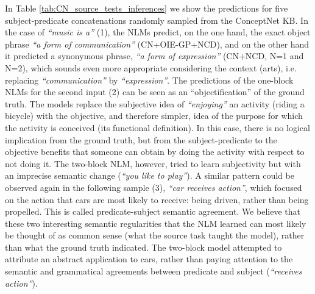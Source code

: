 \documentclass[preprint]{elsarticle}
\begin{document}
In Table \ref{tab:CN_source_tests_inferences} we show the predictions for five subject-predicate concatenations randomly sampled from the ConceptNet KB. In the case of \textit{``music is a''} (1), the NLMs predict, on the one hand, the exact object phrase \textit{``a form of communication''} (CN+OIE-GP+NCD), and on the other hand it predicted a synonymous phrase, \textit{``a form of expression''} (CN+NCD, N=1 and N=2), which sounds even more appropriate considering the context (arts), i.e. replacing \textit{``communication''} by \textit{``expression''}. The predictions of the one-block NLMs for the second input (2) can be seen as an ``objectification'' of the ground truth. The models replace the subjective idea of \textit{``enjoying''} an activity (riding a bicycle) with the objective, and therefore simpler, idea of the purpose for which the activity is conceived (its functional definition). In this case, there is no logical implication from the ground truth, but from the subject-predicate to the objective benefits that someone can obtain by doing the activity with respect to not doing it. The two-block NLM, however, tried to learn subjectivity but with an imprecise semantic change (\textit{``you like to play''}). A similar pattern could be observed again in the following sample (3), \textit{``car receives action''}, which focused on the action that cars are most likely to receive: being driven, rather than being propelled. This is called predicate-subject semantic agreement. We believe that these two interesting semantic regularities that the NLM learned can most likely be thought of as common sense (what the source task taught the model), rather than what the ground truth indicated. The two-block model attempted to attribute an abstract application to cars, rather than paying attention to the semantic and grammatical agreements between predicate and subject (\textit{``receives action''}). 
\end{document}
